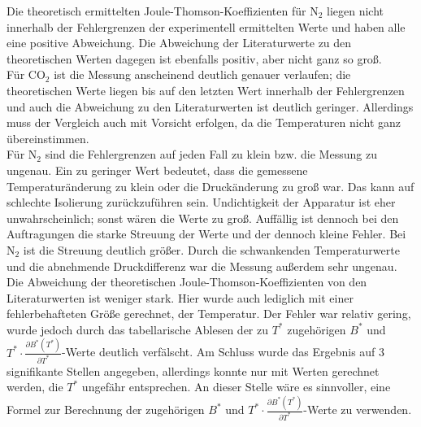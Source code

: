 \documentclass[a4paper,12pt,oneside,onecolum,final,openany]{report}
\begin{document}
Die theoretisch ermittelten Joule-Thomson-Koeffizienten für $\mathrm{N}_2$ liegen nicht innerhalb der Fehlergrenzen der experimentell ermittelten Werte und haben alle eine positive Abweichung. Die Abweichung der Literaturwerte zu den theoretischen Werten dagegen ist ebenfalls positiv, aber nicht ganz so groß. \\

Für $\mathrm{CO}_2$ ist die Messung anscheinend deutlich genauer verlaufen; die theoretischen Werte liegen bis auf den letzten Wert innerhalb der Fehlergrenzen und auch die Abweichung zu den Literaturwerten ist deutlich geringer. Allerdings muss der Vergleich auch mit Vorsicht erfolgen, da die Temperaturen nicht ganz übereinstimmen.\\

Für $\mathrm{N}_2$ sind die Fehlergrenzen auf jeden Fall zu klein bzw. die Messung zu ungenau. Ein zu geringer Wert bedeutet, dass die gemessene Temperaturänderung zu klein oder die Druckänderung zu groß war. Das kann auf schlechte Isolierung zurückzuführen sein. Undichtigkeit der Apparatur ist eher unwahrscheinlich; sonst wären die Werte zu groß. Auffällig ist dennoch bei den Auftragungen die starke Streuung der Werte und der dennoch kleine Fehler. Bei $\mathrm{N}_2$ ist die Streuung deutlich größer. Durch die schwankenden Temperaturwerte und die abnehmende Druckdifferenz war die Messung außerdem sehr ungenau.\\
  
Die Abweichung der theoretischen Joule-Thomson-Koeffizienten von den Literaturwerten ist weniger stark. Hier wurde auch lediglich mit einer fehlerbehafteten Größe gerechnet, der Temperatur. Der Fehler war relativ gering, wurde jedoch durch das tabellarische Ablesen der zu $T^*$ zugehörigen $B^*$ und $T^* \cdot \frac{\partial B^*(T^*)}{\partial T^*}$-Werte deutlich verfälscht. Am Schluss wurde das Ergebnis auf 3 signifikante Stellen angegeben, allerdings konnte nur mit Werten gerechnet werden, die $T^*$ ungefähr entsprechen. An dieser Stelle wäre es sinnvoller, eine Formel zur Berechnung der zugehörigen $B^*$ und $T^* \cdot \frac{\partial B^*(T^*)}{\partial T^*}$-Werte zu verwenden.\\
\end{document}
